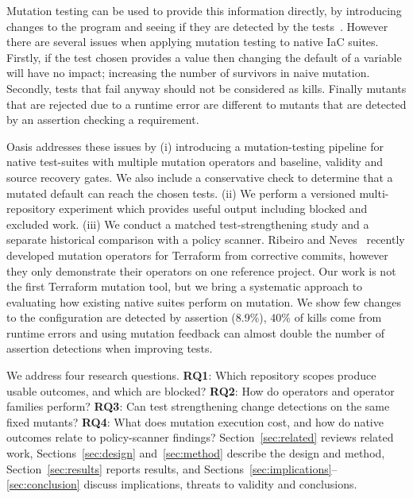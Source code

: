 \documentclass[3p,times,procedia]{elsarticle}
\begin{document}
Mutation testing can be used to provide this information directly, by introducing changes to the program and seeing if they are detected by the tests~\cite{jia,papadakis}. However there are several issues when applying mutation testing to native IaC suites. Firstly, if the test chosen provides a value then changing the default of a variable will have no impact; increasing the number of survivors in naive mutation. Secondly, tests that fail anyway should not be considered as kills. Finally mutants that are rejected due to a runtime error are different to mutants that are detected by an assertion checking a requirement.

Oasis addresses these issues by (i) introducing a mutation-testing pipeline for native test-suites with multiple mutation operators and baseline, validity and source recovery gates. We also include a conservative check to determine that a mutated default can reach the chosen tests. (ii) We perform a versioned multi-repository experiment which provides useful output including blocked and excluded work. (iii) We conduct a matched test-strengthening study and a separate historical comparison with a policy scanner. Ribeiro and Neves~\cite{ribeiro} recently developed mutation operators for Terraform from corrective commits, however they only demonstrate their operators on one reference project. Our work is not the first Terraform mutation tool, but we bring a systematic approach to evaluating how existing native suites perform on mutation. We show few changes to the configuration are detected by assertion (8.9\%), 40\% of kills come from runtime errors and using mutation feedback can almost double the number of assertion detections when improving tests.

We address four research questions. \textbf{RQ1}: Which repository scopes produce usable outcomes, and which are blocked? \textbf{RQ2}: How do operators and operator families perform? \textbf{RQ3}: Can test strengthening change detections on the same fixed mutants? \textbf{RQ4}: What does mutation execution cost, and how do native outcomes relate to policy-scanner findings? Section~\ref{sec:related} reviews related work, Sections~\ref{sec:design} and~\ref{sec:method} describe the design and method, Section~\ref{sec:results} reports results, and Sections~\ref{sec:implications}--\ref{sec:conclusion} discuss implications, threats to validity and conclusions.
\end{document}
